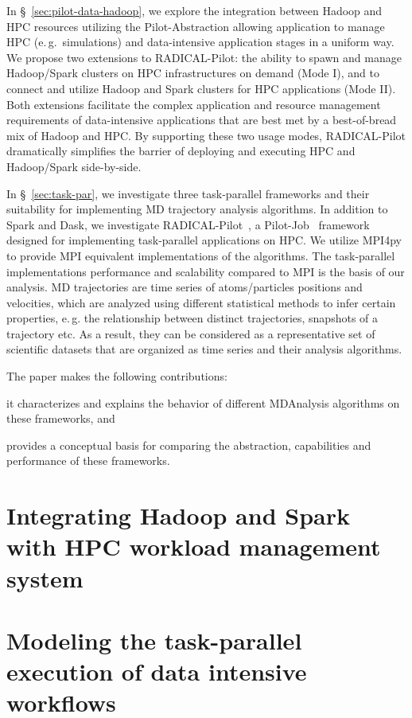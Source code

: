 \label{ch:data_hpc}
In \S~\ref{sec:pilot-data-hadoop}, we explore the integration between Hadoop and HPC resources utilizing the Pilot-Abstraction allowing application to manage HPC (e.\,g.\ simulations) and data-intensive application stages in a uniform way.
We propose two extensions to RADICAL-Pilot: the ability to spawn and manage Hadoop/Spark clusters on HPC infrastructures on demand (Mode I), and to connect and utilize Hadoop and Spark clusters for HPC applications (Mode II).
Both extensions facilitate the complex application and resource management requirements of data-intensive applications that are best met by a best-of-bread mix of Hadoop and HPC. 
By supporting these two usage modes, RADICAL-Pilot dramatically simplifies the barrier of deploying and executing HPC and Hadoop/Spark side-by-side.

In \S~\ref{sec:task-par}, we investigate three task-parallel frameworks and their suitability for implementing MD trajectory analysis algorithms.
In addition to Spark and Dask, we investigate RADICAL-Pilot~\cite{merzky2019using}, a Pilot-Job~\cite{luckow2012pstar} framework designed for implementing task-parallel applications on HPC.
We utilize MPI4py~\cite{dalcin2005mpi} to provide MPI equivalent implementations of the algorithms.
The task-parallel implementations performance and scalability compared to MPI is the basis of our analysis.
MD trajectories are time series of atoms/particles positions and velocities, which are analyzed using different statistical methods to infer certain properties, e.\,g. the relationship between distinct trajectories, snapshots of a trajectory etc.
As a result, they can be considered as a representative set of scientific datasets that are organized as time series and their analysis algorithms. 

The paper makes the following contributions: 
\begin{inparaenum}[i)]
    \item it characterizes and explains the behavior of different MDAnalysis algorithms on these frameworks, and
    \item provides a conceptual basis for comparing the abstraction, capabilities and performance of these frameworks.
\end{inparaenum}


\section{Integrating Hadoop and Spark with HPC workload management system}



\section{Modeling the task-parallel execution of data intensive workflows}
